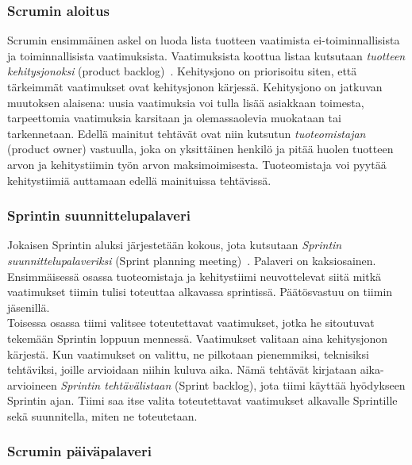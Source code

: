 \documentclass[finnish]{../tktltiki2}
\theoremstyle{definition}
\theoremstyle{remark}
\begin{document}
\subsubsection{Scrumin aloitus}

Scrumin ensimmäinen askel on luoda lista tuotteen vaatimista
ei-toiminnalli\-sista ja toiminnallisista vaatimuksista. Vaatimuksista
koottua listaa kutsutaan \emph{tuotteen kehitysjonoksi} (product backlog)~\cite{ScrumFinnishGuide}. Kehitysjono on priorisoitu siten, että tärkeimmät vaatimukset ovat kehitysjonon kärjessä. Kehitysjono on jatkuvan muutoksen alaisena: uusia vaatimuksia
voi tulla lisää asiakkaan toimesta, tarpeettomia vaatimuksia karsitaan ja olemassaolevia muokataan tai tarkennetaan. Edellä mainitut tehtävät
ovat niin kutsutun \emph{tuoteomistajan} (product owner) vastuulla,
joka on yksittäinen henkilö ja pitää huolen tuotteen arvon ja kehitystiimin työn arvon maksimoimisesta. Tuoteomistaja voi pyytää kehitystiimiä auttamaan edellä mainituissa tehtävissä.

\subsubsection{Sprintin suunnittelupalaveri}

Jokaisen Sprintin aluksi järjestetään kokous, jota kutsutaan \emph{Sprintin suunnittelupalaveriksi} (Sprint planning meeting)~\cite{ScrumHandBook}. Palaveri on kaksiosainen.
Ensimmäisessä osassa tuoteomistaja ja kehitystiimi neuvottelevat
siitä mitkä vaatimukset tiimin tulisi toteuttaa alkavassa
sprintissä. Päätösvastuu on tiimin jäsenillä.\\

Toisessa osassa tiimi valitsee toteutettavat vaatimukset, jotka
he sitoutuvat tekemään Sprintin loppuun mennessä. Vaatimukset
valitaan aina kehitysjonon kärjestä.
Kun vaatimukset on valittu, ne pilkotaan pienemmiksi, teknisiksi
tehtäviksi, joille arvioidaan niihin kuluva aika. Nämä tehtävät kirjataan aika-arvioineen \emph{Sprintin tehtävälistaan} (Sprint backlog), jota tiimi käyttää hyödykseen Sprintin ajan. Tiimi saa itse valita toteutettavat vaatimukset alkavalle Sprintille sekä suunnitella, miten ne toteutetaan.

\subsubsection{Scrumin päiväpalaveri}
\end{document}
